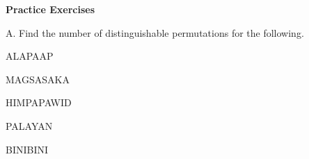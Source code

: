\textbf{Practice Exercises}

\vspce

A. Find the number of distinguishable permutations for the following. 

\begin{enumerate}[label = \arabic*. ]
\begin{multicols}{3}

\item ALAPAAP
\item MAGSASAKA
\item HIMPAPAWID
\item PALAYAN
\item BINIBINI

\end{multicols} 
\end{enumerate}  





 



